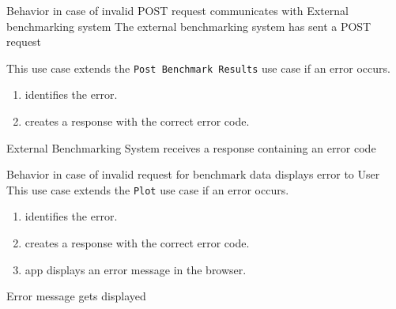 \bigskip

{Behavior in case of invalid POST request}
{communicates with External \Gls{benchmarking system}}
{The external \gls{benchmarking system} has sent a POST request}
{This use case extends the \texttt{Post Benchmark Results} use case if an error occurs.
\begin{enumerate}
    \item \parkview{} identifies the error.
    \item \parkview{} creates a response with the correct error code.
\end{enumerate}}
{External Benchmarking System receives a response containing an error code}

\bigskip

{Behavior in case of invalid request for benchmark data}
{displays error to User}
{This use case extends the \texttt{Plot} use case if an error occurs.}
{\begin{enumerate}
    \item \parkview{} identifies the error.
    \item \parkview{} creates a response with the correct error code.
    \item \parkview{} app displays an error message in the browser.
\end{enumerate}}
{Error message gets displayed}

